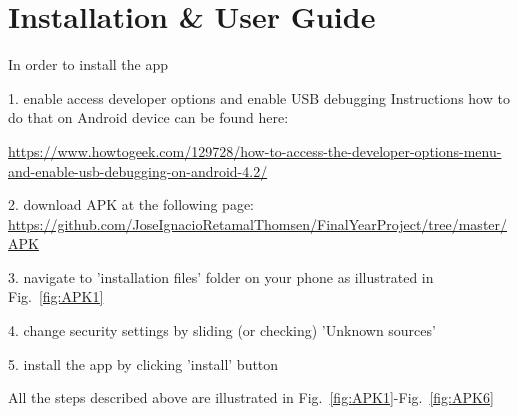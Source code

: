 \chapter{Installation \& User Guide}
In order to install the app 

1. enable access developer options and enable USB debugging
Instructions how to do that on Android device can be found here:

\url{https://www.howtogeek.com/129728/how-to-access-the-developer-options-menu-and-enable-usb-debugging-on-android-4.2/}

2. download APK at the following page:
\url{https://github.com/JoseIgnacioRetamalThomsen/FinalYearProject/tree/master/APK}

3. navigate to 'installation files' folder on your phone as illustrated in Fig.~\ref{fig:APK1}

4. change security settings by sliding (or checking) 'Unknown sources'

5. install the app by clicking 'install' button 

All the steps described above are illustrated in Fig.~\ref{fig:APK1}-Fig.~\ref{fig:APK6}

